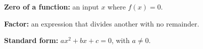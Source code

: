 \begin{vocabbox}
\textbf{Zero of a function:} an input $x$ where $f(x)=0$.\par
\textbf{Factor:} an expression that divides another with no remainder.\par
\textbf{Standard form:} $ax^2+bx+c=0$, with $a\neq0$.
\end{vocabbox}
